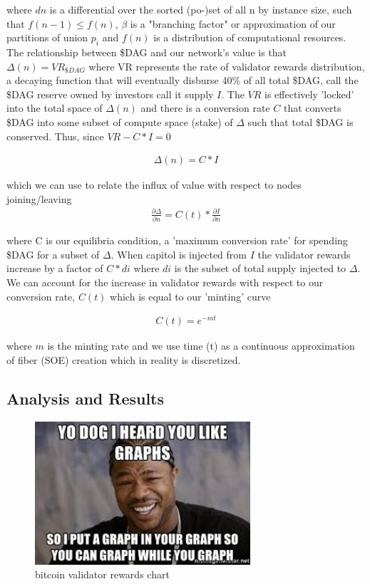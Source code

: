 \documentclass{article}
\begin{document}
where $dn$ is a differential over the sorted (po-)set of all n by instance size, such that $f(n-1) \leq f(n)$, $\beta$ is a "branching factor" or approximation of our partitions of union $p_i$ and $f(n)$ is a distribution of computational resources. The relationship between \$DAG and our network's value is that $\Delta(n) = VR_{\$DAG}$ where VR represents the rate of validator rewards distribution, a decaying function that will eventually disburse 40\% of all total \$DAG, call the \$DAG reserve owned by investors call it supply $I$. The $VR$ is effectively 'locked' into the total space of $\Delta(n)$ and there is a conversion rate $C$ that converts \$DAG into some subset of compute space (stake) of $\Delta$ such that total \$DAG is conserved. Thus, since $VR - C*I = 0$ 

\begin{equation*} \label{eq1}
\begin{split}
\Delta(n) = C* I
\end{split}
\end{equation*}

which we can use to relate the influx of value with respect to nodes joining/leaving
\begin{equation*} \label{eq1}
\begin{split}
\frac{\partial \Delta}{\partial n} = C(t)* \frac{\partial I}{\partial n}
\end{split}
\end{equation*}

where C is our equilibria condition, a 'maximum conversion rate' for spending \$DAG for a subset of $\Delta$. When capitol is injected from $I$ the validator rewards increase by a factor of $C*di$ where $di$ is the subset of total supply injected to $\Delta$. We can account for the increase in validator rewards with respect to our conversion rate, $C(t)$ which is equal to our 'minting' curve

\begin{equation*} \label{eq1}
\begin{split}
C(t) = e^{-mt}
\end{split}
\end{equation*}

where $m$ is the minting rate and we use time (t) as a continuous approximation of fiber (SOE) creation which in reality is discretized.
\subsection{Analysis and Results}
\begin{figure}[h]
\caption{bitcoin validator rewards chart}
\includegraphics[width=8cm]{yo_dawg}
\centering
\end{figure}
\end{document}
